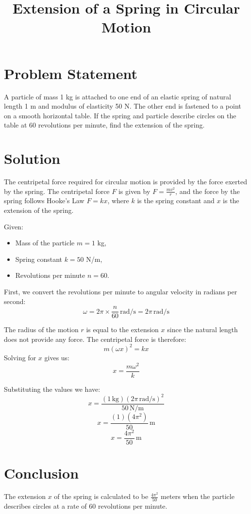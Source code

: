\documentclass{article}
\begin{document}
\title{Extension of a Spring in Circular Motion}
\date{}
\maketitle

\section*{Problem Statement}
A particle of mass 1 kg is attached to one end of an elastic spring of natural length 1 m and modulus of elasticity 50 N. The other end is fastened to a point on a smooth horizontal table. If the spring and particle describe circles on the table at 60 revolutions per minute, find the extension of the spring.

\section*{Solution}
The centripetal force required for circular motion is provided by the force exerted by the spring. The centripetal force \( F \) is given by \( F = \frac{mv^2}{r} \), and the force by the spring follows Hooke's Law \( F = kx \), where \( k \) is the spring constant and \( x \) is the extension of the spring.

Given:
\begin{itemize}
    \item Mass of the particle \( m = 1 \) kg,
    \item Spring constant \( k = 50 \) N/m,
    \item Revolutions per minute \( n = 60 \).
\end{itemize}

First, we convert the revolutions per minute to angular velocity in radians per second:
\[ \omega = 2\pi \times \frac{n}{60} \, \text{rad/s} = 2\pi \, \text{rad/s} \]

The radius of the motion \( r \) is equal to the extension \( x \) since the natural length does not provide any force. The centripetal force is therefore:
\[ m(\omega x)^2 = kx \]
Solving for \( x \) gives us:
\[ x = \frac{m\omega^2}{k} \]

Substituting the values we have:
\[ x = \frac{(1 \, \text{kg})(2\pi \, \text{rad/s})^2}{50 \, \text{N/m}} \]
\[ x = \frac{(1)(4\pi^2)}{50} \, \text{m} \]
\[ x = \frac{4\pi^2}{50} \, \text{m} \]

\section*{Conclusion}
The extension \( x \) of the spring is calculated to be \( \frac{4\pi^2}{50} \) meters when the particle describes circles at a rate of 60 revolutions per minute.
\end{document}
